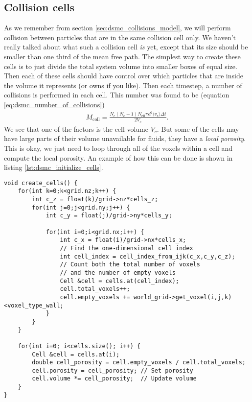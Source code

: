 \subsection{Collision cells}
As we remember from section \ref{sec:dsmc_collisions_model}, we will perform collision between particles that are in the same collision cell only. We haven't really talked about what such a collision cell \textit{is} yet, except that its size should be smaller than one third of the mean free path. The simplest way to create these cells is to just divide the total system volume into smaller boxes of equal size. Then each of these cells should have control over which particles that are inside the volume it represents (or owns if you like). Then each timestep, a number of collisions is performed in each cell. This number was found to be (equation \eqref{eq:dsmc_number_of_collisions})
\begin{align}
	\nonumber
	M_\text{coll} = \frac{N_c(N_c-1)N_\text{eff}\pi d^2\langle v_r \rangle \Delta t}{2 V_c}.
\end{align}
We see that one of the factors is the cell volume $V_c$. But some of the cells may have large parts of their volume unavailable for fluids, they have a \textit{local porosity}. This is okay, we just need to loop through all of the voxels within a cell and compute the local porosity. An example of how this can be done is shown in listing \ref{lst:dsmc_initialize_cells}.
\begin{lstlisting}[caption=Example code showing how to find porosity and volume of the collision cells., label=lst:dsmc_initialize_cells]
void create_cells() {
    for(int k=0;k<grid.nz;k++) {
        int c_z = float(k)/grid->nz*cells_z;
        for(int j=0;j<grid.ny;j++) {
            int c_y = float(j)/grid->ny*cells_y;

            for(int i=0;i<grid.nx;i++) {
                int c_x = float(i)/grid->nx*cells_x;
                // Find the one-dimensional cell index 
                int cell_index = cell_index_from_ijk(c_x,c_y,c_z);
                // Count both the total number of voxels
                // and the number of empty voxels
                Cell &cell = cells.at(cell_index);
                cell.total_voxels++;
                cell.empty_voxels += world_grid->get_voxel(i,j,k)<voxel_type_wall;
            }
        }
    }

    for(int i=0; i<cells.size(); i++) {
    	Cell &cell = cells.at(i);
    	double cell_porosity = cell.empty_voxels / cell.total_voxels;
    	cell.porosity = cell_porosity; // Set porosity
    	cell.volume *= cell_porosity;  // Update volume
    }
}
\end{lstlisting}

